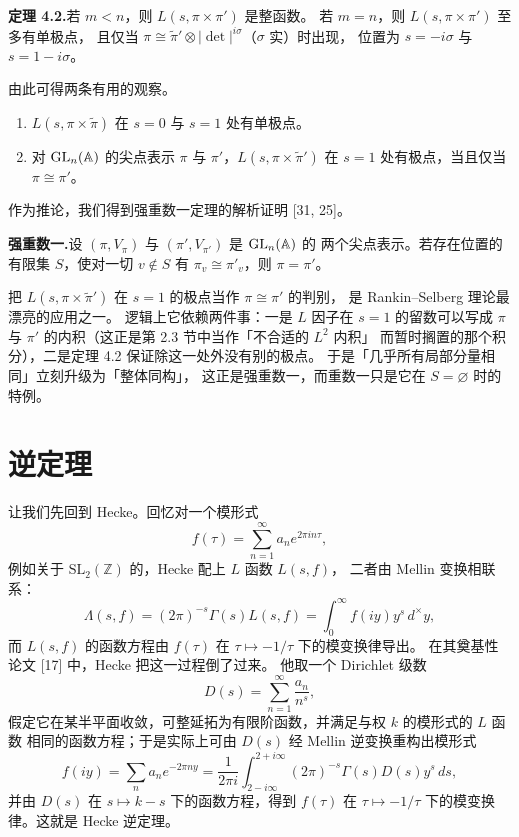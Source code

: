 \textbf{定理 4.2.}\quad 若 $m<n$，则 $L(s,\pi\times\pi')$ 是整函数。
若 $m=n$，则 $L(s,\pi\times\pi')$ 至多有单极点，
且仅当 $\pi\cong\widetilde{\pi}'\otimes|\det|^{i\sigma}$（$\sigma$ 实）时出现，
位置为 $s=-i\sigma$ 与 $s=1-i\sigma$。

由此可得两条有用的观察。
\begin{enumerate}
\item $L(s,\pi\times\widetilde{\pi})$ 在 $s=0$ 与 $s=1$ 处有单极点。
\item 对 $\mathrm{GL}_n(\mathbb{A})$ 的尖点表示 $\pi$ 与 $\pi'$，$L(s,\pi\times\widetilde{\pi}')$
在 $s=1$ 处有极点，当且仅当 $\pi\cong\pi'$。
\end{enumerate}
作为推论，我们得到强重数一定理的解析证明 [31, 25]。

\textbf{强重数一.}\quad 设 $(\pi,V_\pi)$ 与 $(\pi',V_{\pi'})$ 是 $\mathrm{GL}_n(\mathbb{A})$ 的
两个尖点表示。若存在位置的有限集 $S$，使对一切 $v\notin S$ 有
$\pi_v\cong\pi'_v$，则 $\pi=\pi'$。
\begin{annote}
把 $L(s,\pi\times\widetilde{\pi}')$ 在 $s=1$ 的极点当作 $\pi\cong\pi'$ 的判别，
是 Rankin--Selberg 理论最漂亮的应用之一。
逻辑上它依赖两件事：一是 $L$ 因子在 $s=1$ 的留数可以写成
$\pi$ 与 $\pi'$ 的内积（这正是第 2.3 节中当作「不合适的 $L^2$ 内积」
而暂时搁置的那个积分），二是定理 4.2 保证除这一处外没有别的极点。
于是「几乎所有局部分量相同」立刻升级为「整体同构」，
这正是强重数一，而重数一只是它在 $S=\varnothing$ 时的特例。
\par{}
\end{annote}
\section{逆定理}

让我们先回到 Hecke。回忆对一个模形式
\[
f(\tau)=\sum_{n=1}^{\infty}a_ne^{2\pi in\tau},
\]
例如关于 $\mathrm{SL}_2(\mathbb{Z})$ 的，Hecke 配上 $L$ 函数 $L(s,f)$，
二者由 Mellin 变换相联系：
\[
\Lambda(s,f)=(2\pi)^{-s}\Gamma(s)L(s,f)=\int_0^\infty f(iy)y^s\,d^\times y,
\]
而 $L(s,f)$ 的函数方程由 $f(\tau)$ 在 $\tau\mapsto-1/\tau$ 下的模变换律导出。
在其奠基性论文 [17] 中，Hecke 把这一过程倒了过来。
他取一个 Dirichlet 级数
\[
D(s)=\sum_{n=1}^{\infty}\frac{a_n}{n^s},
\]
假定它在某半平面收敛，可整延拓为有限阶函数，并满足与权 $k$ 的模形式的 $L$ 函数
相同的函数方程；于是实际上可由 $D(s)$ 经 Mellin 逆变换重构出模形式
\[
f(iy)=\sum_na_ne^{-2\pi ny}
=\frac{1}{2\pi i}\int_{2-i\infty}^{2+i\infty}(2\pi)^{-s}\Gamma(s)D(s)y^s\,ds,
\]
并由 $D(s)$ 在 $s\mapsto k-s$ 下的函数方程，得到 $f(\tau)$ 在
$\tau\mapsto-1/\tau$ 下的模变换律。这就是 Hecke 逆定理。

